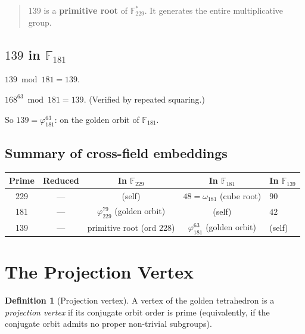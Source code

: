 \documentclass[12pt,oneside]{article}
\theoremstyle{principia}
\theoremstyle{definition}
\newtheorem{definition}[theorem]{Definition}
\theoremstyle{remark}
\begin{document}
\begin{quote}
$139$ is a \textbf{primitive root} of $\mathbb{F}_{229}^*$.
It generates the entire multiplicative group.
\end{quote}

\subsection{$139$ in $\mathbb{F}_{181}$}

$139 \bmod 181 = 139$.

$168^{63} \bmod 181 = 139$. (Verified by repeated squaring.)

So $139 = \varphi_{181}^{63}$: on the golden orbit of $\mathbb{F}_{181}$.

\subsection{Summary of cross-field embeddings}

\begin{center}
\begin{tabular}{@{}ccccl@{}}
\toprule
Prime & Reduced & In $\mathbb{F}_{229}$ & In $\mathbb{F}_{181}$ & In $\mathbb{F}_{139}$ \\
\midrule
229 & --- & (self) & $48 = \omega_{181}$ (cube root) & $90$ \\
181 & --- & $\varphi_{229}^{79}$ (golden orbit) & (self) & $42$ \\
139 & --- & primitive root (ord $228$) & $\varphi_{181}^{63}$ (golden orbit) & (self) \\
\bottomrule
\end{tabular}
\end{center}

\section{The Projection Vertex}
\label{sec:projection}

\begin{definition}[Projection vertex]
A vertex of the golden tetrahedron is a \emph{projection vertex}
if its conjugate orbit order is prime (equivalently, if the
conjugate orbit admits no proper non-trivial subgroups).
\end{definition}
\end{document}
